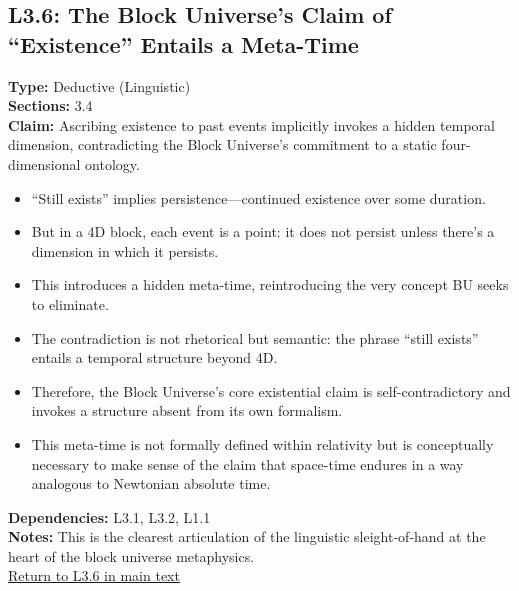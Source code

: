 \documentclass[12pt]{book}
\newcommand{\returnlink}[1]{\hyperref[logic:#1]{Return to #1 in main text}\xspace}
\begin{document}
\subsection*{L3.6: The Block Universe's Claim of ``Existence'' Entails a Meta-Time}\label{appendix:L3.6}
\textbf{Type:} Deductive (Linguistic) \\
\textbf{Sections:} 3.4 \\
\textbf{Claim:} Ascribing existence to past events implicitly invokes a hidden temporal dimension, contradicting the Block Universe's commitment to a static four-dimensional ontology.
\begin{itemize}
  \item ``Still exists'' implies persistence---continued existence over some duration.
  \item But in a 4D block, each event is a point: it does not persist unless there's a dimension in which it persists.
  \item This introduces a hidden meta-time, reintroducing the very concept BU seeks to eliminate.
  \item The contradiction is not rhetorical but semantic: the phrase ``still exists'' entails a temporal structure beyond 4D.
  \item Therefore, the Block Universe's core existential claim is self-contradictory and invokes a structure absent from its own formalism.
  \item This meta-time is not formally defined within relativity but is conceptually necessary to make sense of the claim that space-time endures in a way analogous to Newtonian absolute time.
\end{itemize}
\textbf{Dependencies:} L3.1, L3.2, L1.1 \\
\textbf{Notes:} This is the clearest articulation of the linguistic sleight-of-hand at the heart of the block universe metaphysics.\\
\returnlink{L3.6}
\end{document}
